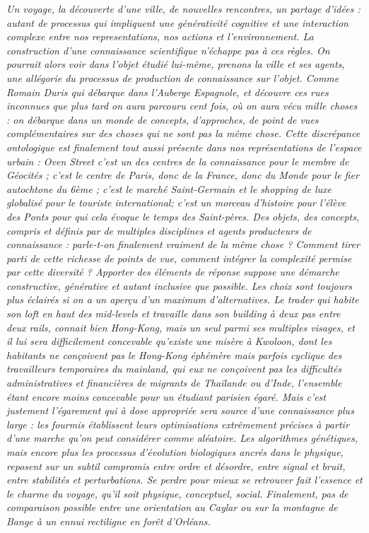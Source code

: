 {}{
\textit{Un voyage, la découverte d'une ville, de nouvelles rencontres, un partage d'idées : autant de processus qui impliquent une générativité cognitive et une interaction complexe entre nos representations, nos actions et l'environnement. La construction d'une connaissance scientifique n'échappe pas à ces règles. On pourrait alors voir dans l'objet étudié lui-même, prenons la ville et ses agents, une allégorie du processus de production de connaissance sur l'objet. Comme Romain Duris qui débarque dans l'Auberge Espagnole, et découvre ces rues inconnues que plus tard on aura parcouru cent fois, où on aura vécu mille choses : on débarque dans un monde de concepts, d'approches, de point de vues complémentaires sur des choses qui ne sont pas la même chose. Cette discrépance ontologique est finalement tout aussi présente dans nos représentations de l'espace urbain : \emph{Oven Street} c'est un des centres de la connaissance pour le membre de Géocités ; c'est le centre de Paris, donc de la France, donc du Monde pour le fier autochtone du 6ème ; c'est le marché Saint-Germain et le shopping de luxe globalisé pour le touriste international; c'est un morceau d'histoire pour l'élève des Ponts pour qui cela évoque le temps des Saint-pères. Des objets, des concepts, compris et définis par de multiples disciplines et agents producteurs de connaissance : parle-t-on finalement vraiment de la même chose ? Comment tirer parti de cette richesse de points de vue, comment intégrer la complexité permise par cette diversité ? Apporter des éléments de réponse suppose une démarche constructive, générative et autant inclusive que possible. Les choix sont toujours plus éclairés si on a un aperçu d'un maximum d'alternatives. Le trader qui habite son loft en haut des \emph{mid-levels} et travaille dans son building à deux pas entre deux rails, connait bien Hong-Kong, mais un seul parmi ses multiples visages, et il lui sera difficilement concevable qu'existe une misère à Kwoloon, dont les habitants ne conçoivent pas le Hong-Kong éphémère mais parfois cyclique des travailleurs temporaires du mainland, qui eux ne conçoivent pas les difficultés administratives et financières de migrants de Thaïlande ou d'Inde, l'ensemble étant encore moins concevable pour un étudiant parisien égaré. Mais c'est justement l'égarement qui à dose appropriée sera source d'une connaissance plus large : les fourmis établissent leurs optimisations extrêmement précises à partir d'une marche qu'on peut considérer comme aléatoire. Les algorithmes génétiques, mais encore plus les processus d'évolution biologiques ancrés dans le physique, reposent sur un subtil compromis entre ordre et désordre, entre signal et bruit, entre stabilités et perturbations. Se perdre pour mieux se retrouver fait l'essence et le charme du voyage, qu'il soit physique, conceptuel, social. Finalement, pas de comparaison possible entre une orientation au Caylar ou sur la montagne de Bange à un ennui rectiligne en forêt d'Orléans.}
}


